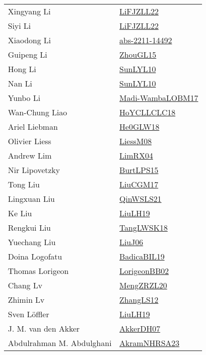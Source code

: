 {\begin{longtable}{p{4cm}p{20cm}}
Xingyang Li & \href{papers/LiFJZLL22.pdf}{LiFJZLL22}\cite{LiFJZLL22} \\
Siyi Li & \href{papers/LiFJZLL22.pdf}{LiFJZLL22}\cite{LiFJZLL22} \\
Xiaodong Li & \href{articles/abs-2211-14492.pdf}{abs-2211-14492}\cite{abs-2211-14492} \\
Guipeng Li & \href{papers/ZhouGL15.pdf}{ZhouGL15}\cite{ZhouGL15} \\
Hong Li & \href{papers/SunLYL10.pdf}{SunLYL10}\cite{SunLYL10} \\
Nan Li & \href{papers/SunLYL10.pdf}{SunLYL10}\cite{SunLYL10} \\
Yunbo Li & \href{papers/Madi-WambaLOBM17.pdf}{Madi-WambaLOBM17}\cite{Madi-WambaLOBM17} \\
Wan{-}Chung Liao & \href{papers/HoYCLLCLC18.pdf}{HoYCLLCLC18}\cite{HoYCLLCLC18} \\
Ariel Liebman & \href{papers/He0GLW18.pdf}{He0GLW18}\cite{He0GLW18} \\
Olivier Liess & \href{articles/LiessM08.pdf}{LiessM08}\cite{LiessM08} \\
Andrew Lim & \href{papers/LimRX04.pdf}{LimRX04}\cite{LimRX04} \\
Nir Lipovetzky & \href{papers/BurtLPS15.pdf}{BurtLPS15}\cite{BurtLPS15} \\
Tong Liu & \href{papers/LiuCGM17.pdf}{LiuCGM17}\cite{LiuCGM17} \\
Lingxuan Liu & \href{articles/QinWSLS21.pdf}{QinWSLS21}\cite{QinWSLS21} \\
Ke Liu & \href{papers/LiuLH19.pdf}{LiuLH19}\cite{LiuLH19} \\
Rengkui Liu & \href{}{TangLWSK18}\cite{TangLWSK18} \\
Yuechang Liu & \href{papers/LiuJ06.pdf}{LiuJ06}\cite{LiuJ06} \\
Doina Logofatu & \href{papers/BadicaBIL19.pdf}{BadicaBIL19}\cite{BadicaBIL19} \\
Thomas Lorigeon & \href{}{LorigeonBB02}\cite{LorigeonBB02} \\
Chang Lv & \href{articles/MengZRZL20.pdf}{MengZRZL20}\cite{MengZRZL20} \\
Zhimin Lv & \href{papers/ZhangLS12.pdf}{ZhangLS12}\cite{ZhangLS12} \\
Sven L{\"{o}}ffler & \href{papers/LiuLH19.pdf}{LiuLH19}\cite{LiuLH19} \\
J. M. van den Akker & \href{papers/AkkerDH07.pdf}{AkkerDH07}\cite{AkkerDH07} \\
Abdulrahman M. Abdulghani & \href{articles/AkramNHRSA23.pdf}{AkramNHRSA23}\cite{AkramNHRSA23} \\

\end{longtable}}
